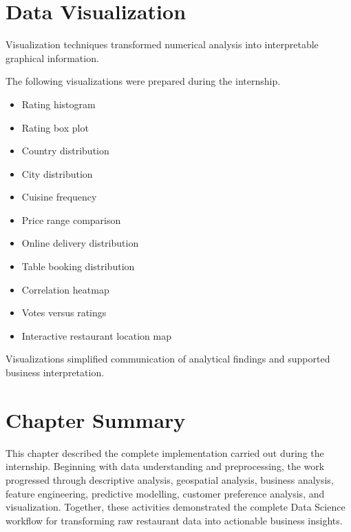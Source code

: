 \documentclass[12pt,a4paper]{report}
\begin{document}

\section{Data Visualization}

Visualization techniques transformed numerical analysis into interpretable graphical information.

The following visualizations were prepared during the internship.

\begin{itemize}
\item Rating histogram
\item Rating box plot
\item Country distribution
\item City distribution
\item Cuisine frequency
\item Price range comparison
\item Online delivery distribution
\item Table booking distribution
\item Correlation heatmap
\item Votes versus ratings
\item Interactive restaurant location map
\end{itemize}

Visualizations simplified communication of analytical findings and supported business interpretation.


\section{Chapter Summary}

This chapter described the complete implementation carried out during the internship. Beginning with data understanding and preprocessing, the work progressed through descriptive analysis, geospatial analysis, business analysis, feature engineering, predictive modelling, customer preference analysis, and visualization. Together, these activities demonstrated the complete Data Science workflow for transforming raw restaurant data into actionable business insights.


\end{document}
